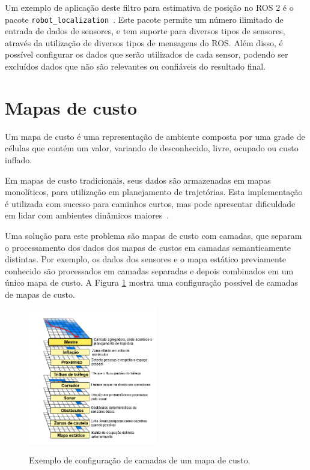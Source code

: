 \documentclass[repeatfields,xlists,xpacks,oneside,yearsonly]{ufrgscca}
\begin{document}
Um exemplo de aplicação deste filtro para estimativa de posição no
ROS 2 é o pacote
\texttt{robot\_localization}~\cite{robot_localization_paper}. Este
pacote permite um número ilimitado de entrada de dados de sensores, e
tem suporte para diversos tipos de sensores, através da utilização de
diversos tipos de mensagens do ROS. Além disso, é possível configurar
os dados que serão utilizados de cada sensor, podendo ser excluídos
dados que não são relevantes ou confiáveis do resultado final.

\section{Mapas de custo}


Um mapa de custo é uma representação de ambiente composta por uma
grade de células que contém um valor, variando de desconhecido,
livre, ocupado ou custo inflado.

Em mapas de custo tradicionais, seus dados são armazenadas em mapas
monolíticos, para utilização em planejamento de trajetórias. Esta
implementação é utilizada com sucesso para caminhos curtos, mas pode
apresentar dificuldade em lidar com ambientes dinâmicos
maiores~\cite{layered_costmaps}.

Uma solução para este problema são mapas de custo com camadas, que
separam o processamento dos dados dos mapas de custos em camadas
semanticamente distintas. Por exemplo, os dados dos sensores e o mapa
estático previamente conhecido são processados em camadas separadas e
depois combinados em um único mapa de custo. A Figura
\ref{fig:mapa_camadas} mostra uma configuração possível de camadas de
mapas de custo. 

\begin{figure}[h]
    {
        \centering
        \caption{Exemplo de configuração de camadas de um mapa de custo.}
        \label{fig:mapa_camadas}
        \includegraphics[width=0.5\textwidth]{mapa_camadas_trad.png}\\
    }
    {}
\end{figure}
\end{document}
